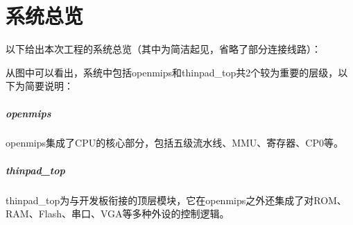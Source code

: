 \chapter{系统总览}

以下给出本次工程的系统总览（其中为简洁起见，省略了部分连接线路）：


从图中可以看出，系统中包括openmips和thinpad\_top共2个较为重要的层级，以下为简要说明：

    \paragraph{openmips} openmips集成了CPU的核心部分，包括五级流水线、MMU、寄存器、CP0等。
    \paragraph{thinpad\_top} thinpad\_top为与开发板衔接的顶层模块，它在openmips之外还集成了对ROM、RAM、Flash、串口、VGA等多种外设的控制逻辑。
